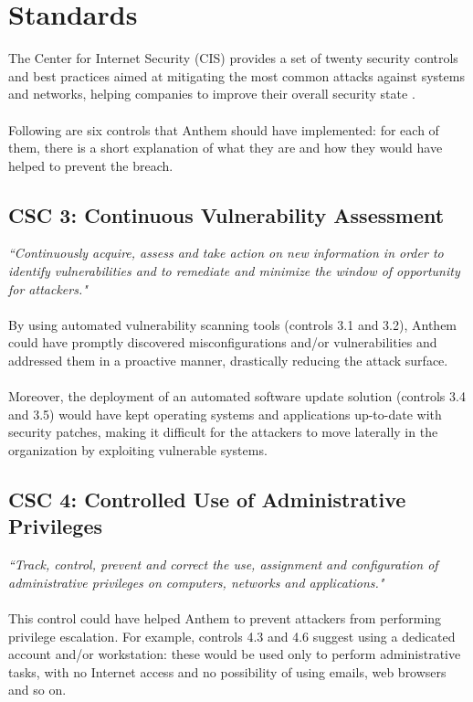 \section{Standards} 
	The Center for Internet Security (CIS) provides a set of twenty security controls and best practices aimed at mitigating the most common attacks against systems and networks, helping companies to improve their overall security state \cite{cis}.\\\\
	Following are six controls that Anthem should have implemented: for each of them, there is a short explanation of what they are and how they would have helped to prevent the breach.
	\subsection{CSC 3: Continuous Vulnerability Assessment}
	\textit{``Continuously acquire, assess and take action on new information in order to identify vulnerabilities and to remediate and minimize the window of opportunity for attackers."}\\\\
	By using automated vulnerability scanning tools (controls 3.1 and 3.2), Anthem could have promptly discovered misconfigurations and/or vulnerabilities and addressed them in a proactive manner, drastically reducing the attack surface.\\\\
	Moreover, the deployment of an automated software update solution (controls 3.4 and 3.5) would have kept operating systems and applications up-to-date with security patches, making it difficult for the attackers to move laterally in the organization by exploiting vulnerable systems.
	\subsection{CSC 4: Controlled Use of Administrative Privileges}
	\textit{``Track, control, prevent and correct the use, assignment and configuration of administrative privileges on computers, networks and applications."}\\\\
	This control could have helped Anthem to prevent attackers from performing privilege escalation. For example, controls 4.3 and 4.6 suggest using a dedicated account and/or workstation: these would be used only to perform administrative tasks, with no Internet access and no possibility of using emails, web browsers and so on.
